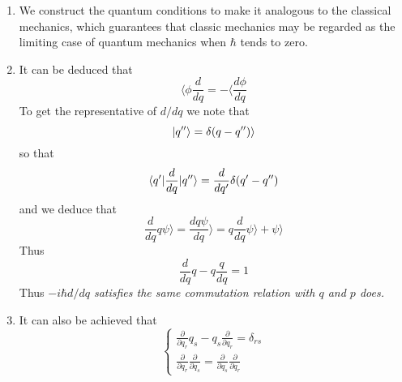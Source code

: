 \begin{enumerate}
	\item We construct the quantum conditions to make it analogous to the classical mechanics, which guarantees that classic mechanics may be regarded as the limiting case of quantum mechanics when $\hbar$ tends to zero.

	\item It can be deduced that
	\begin{equation}
	\langle \phi \frac{d}{dq}=-\langle \frac{d \phi}{dq}
	\end{equation}
	To get the representative of $d/dq$ we note that
	\begin{equation}
	| q'' \rangle = \delta(q-q'') \rangle
	\end{equation}
	so that
	\begin{equation}
	\langle q' | \frac{d}{dq} | q'' \rangle = \frac{d}{dq'}\delta(q'-q'')
	\end{equation}
	and we deduce that 
	\begin{equation}
	\frac{d}{dq} q \psi\rangle = \frac{dq\psi}{dq}\rangle = q\frac{d}{dq} \psi \rangle + \psi \rangle
	\end{equation}
	Thus
	\begin{equation}
	\frac{d}{dq} q - q\frac{q}{dq} =1
	\end{equation}
	Thus \emph{$-i\hbar d/dq$ satisfies the same commutation relation with $q$ and $p$ does.}

	\item It can also be achieved that
	\begin{equation}
	\begin{cases}
	\frac{\partial}{\partial q_r} q_s - q_s \frac{\partial }{\partial q_r} =\delta_{rs}\\
	\frac{\partial}{\partial q_r} \frac{\partial}{\partial q_s}= \frac{\partial}{\partial q_s}\frac{\partial}{\partial q_r} 
	\end{cases}
	\end{equation}


\end{enumerate}
